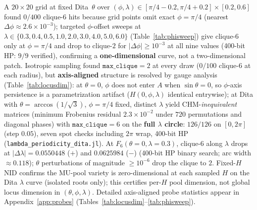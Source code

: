 \documentclass[onecolumn]{IEEEtran}
\begin{document}
A $20\times20$ grid at fixed Dita~$\theta$ over $(\phi,\lambda)\in[\pi/4{-}0.2,\pi/4{+}0.2]\times[0.2,0.6]$ found $0/400$ clique-$6$ hits because grid points omit exact $\phi=\pi/4$ (nearest $\Delta\phi\approx2.6\times10^{-3}$); targeted $\phi$-offset sweeps at $\lambda\in\{0.3,0.4,0.5,1.0,2.0,3.0,4.0,5.0,6.0\}$ (Table~\ref{tab:phisweep}) give clique-$6$ only at $\phi=\pi/4$ and drop to clique-$2$ for $|\Delta\phi|\ge10^{-3}$ at all nine values (400-bit HP: $9/9$ verified), confirming a \textbf{one-dimensional} curve, not a two-dimensional patch.
Isotropic sampling found $\texttt{max\_clique}=2$ at every draw ($0/100$ clique-$6$ at each radius), but \textbf{axis-aligned} structure is resolved by gauge analysis (Table~\ref{tab:locusdim}): at $\theta=0$, $\phi$ does not enter $A$ when $\sin\theta=0$, so $\phi$-axis persistence is a parametrization artifact ($H(0,\phi,\lambda)$ identical entrywise); at Dita with $\theta=\arccos(1/\sqrt{3})$, $\phi=\pi/4$ fixed, distinct $\lambda$ yield CHM-\emph{inequivalent} matrices (minimum Frobenius residual $2.3\times10^{-2}$ under $720$ permutations and diagonal phases) with $\texttt{max\_clique}=6$ on the \textbf{full $\lambda$ circle}: $126/126$ on $[0,2\pi]$ (step $0.05$), seven spot checks including $2\pi$ wrap, 400-bit HP (\texttt{lambda\_periodicity\_dita.jl}).
At $F_6(\theta{=}0,\lambda{=}0.3)$, clique-$6$ along $\lambda$ drops at $|\Delta\lambda|{=}0.0550448$ ($+$) and $0.0625984$ ($-$) (400-bit HP binary search; arc width $\approx0.118$); $\theta$ perturbations of magnitude $\ge10^{-6}$ drop the clique to $2$.
Fixed-$H$ NID confirms the MU-pool variety is zero-dimensional at each sampled $H$ on the Dita $\lambda$ curve (isolated roots only); this certifies per-$H$ pool dimension, not global locus dimension in $(\theta,\phi,\lambda)$.
Detailed axis-aligned probe statistics appear in Appendix~\ref{app:probes} (Tables~\ref{tab:locusdim}--\ref{tab:phisweep}).
\end{document}
